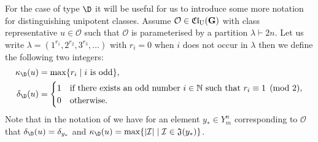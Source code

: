 \documentclass[eqthmnum]{jt-calcs}
\newcommand{\Clu}{\ensuremath{\mathfrak{Cl}_{\mathrm{U}}}}
\begin{document}
\begin{pa}
For the case of type $\D$ it will be useful for us to introduce some more notation for distinguishing unipotent classes. Assume $\mathcal{O} \in \Clu(\bG)$ with class representative $u \in \mathcal{O}$ such that $\mathcal{O}$ is parameterised by a partition $\lambda \vdash 2n$. Let us write $\lambda = (1^{r_1},2^{r_2},3^{r_3},\dots)$ with $r_i = 0$ when $i$ does not occur in $\lambda$ then we define the following two integers:
\begin{align*}
\kappa_{\D}(u) &= \max\{r_i \mid i\text{ is odd}\},\\
\delta_{\D}(u) &= \begin{cases}
1 & \text{if there exists an odd number }i\in\mathbb{N}\text{ such that }r_i \equiv 1\pmod{2},\\
0 & \text{otherwise}.
\end{cases}
\end{align*}
Note that in the notation of \cite{lusztig:2009:unipotent-classes-and-special-Weyl} we have for an element $y_* \in Y_m^n$ corresponding to $\mathcal{O}$ that $\delta_{\D}(u) = \delta_{y_*}$ and $\kappa_{\D}(u) = \max\{|\mathcal{I}| \mid \mathcal{I} \in \mathfrak{J}(y_*)\}$.
\end{pa}
\end{document}
